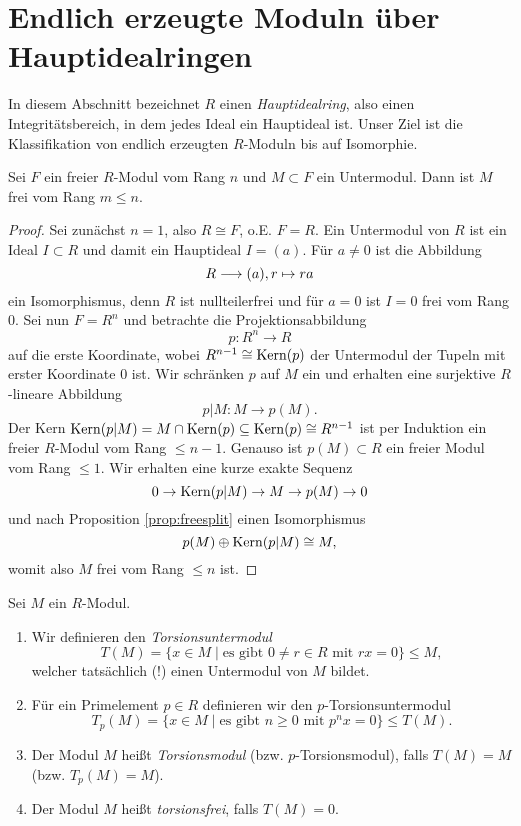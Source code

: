 \documentclass{book}
\begin{document}
\section{Endlich erzeugte Moduln über Hauptidealringen}%
\label{sub:endlich_erzeugte_moduln_uber_hauptidealringen}

In diesem Abschnitt bezeichnet $R$ einen \emph{Hauptidealring}, also einen
Integritätsbereich, in dem jedes Ideal ein Hauptideal ist. Unser Ziel ist die
Klassifikation von endlich erzeugten $R$-Moduln bis auf Isomorphie. 

\begin{lem}
    \label{lem:subfree}
    Sei $F$ ein freier $R$-Modul vom Rang $n$ und $M \subset F$ ein Untermodul.
    Dann ist $M$ frei vom Rang $m \le n$.
\end{lem}
\begin{proof}
    Sei zunächst $n = 1$, also $R \cong F$, o.E. $F = R$. Ein Untermodul von
    $R$ ist ein Ideal $I \subset R$ und damit ein Hauptideal $I = (a)$. Für $a \ne 0$ ist die Abbildung
    \[
        R \longrightarrow (a), r \mapsto ra
    \]
    ein Isomorphismus, denn $R$ ist nullteilerfrei und für $a = 0$ ist $I = 0$ frei vom Rang $0$. Sei nun $F = R^n$ und betrachte die Projektionsabbildung
    \[
        p: R^n \to R
    \]
    auf die erste Koordinate, wobei $R^{n-1} \cong \operatorname{Kern}(p)$ der Untermodul der
    Tupeln mit erster Koordinate $0$ ist. Wir schränken $p$ auf $M$ ein und
    erhalten eine surjektive $R$-lineare Abbildung
    \[
        p|M: M \to p(M).
    \]
    Der Kern $\operatorname{Kern}(p|M) = M \cap \operatorname{Kern}(p) \subseteq \operatorname{Kern}(p) \cong R^{n-1}$ ist
    per Induktion ein freier $R$-Modul vom Rang $\le n-1$. Genauso ist $p(M)
    \subset R$ ein freier Modul vom Rang $\le 1$. Wir erhalten eine kurze exakte Sequenz
    \[
        0 \to \operatorname{Kern}(p|M) \to M \to p(M) \to 0
    \]
    und nach Proposition \ref{prop:freesplit} einen Isomorphismus
    \[
        p(M) \oplus \operatorname{Kern}(p|M) \cong M,
    \]
    womit also $M$ frei vom Rang $\le n$ ist. 
\end{proof}

\begin{defi} Sei $M$ ein $R$-Modul.
    \label{defi:torsion} 
    \begin{enumerate}
        \item Wir definieren den \emph{Torsionsuntermodul}
            \[
                T(M) = \{ x \in M\; | \; \text{es gibt $0 \ne r \in R$ mit $rx = 0$} \} \le M,
            \]
            welcher tatsächlich (!) einen Untermodul von $M$ bildet.
        \item Für ein Primelement $p \in R$ definieren wir den $p$-Torsionsuntermodul
            \[
                T_p(M) = \{ x \in M\; | \; \text{es gibt $n \ge 0 $ mit $p^n x = 0$} \} \le T(M).
            \]
        \item Der Modul $M$ heißt \emph{Torsionsmodul} (bzw. $p$-Torsionsmodul), falls $T(M) = M$ (bzw. $T_p(M) = M$).
        \item Der Modul $M$ heißt \emph{torsionsfrei}, falls $T(M) = 0$. 
    \end{enumerate}    
\end{defi}
\end{document}
